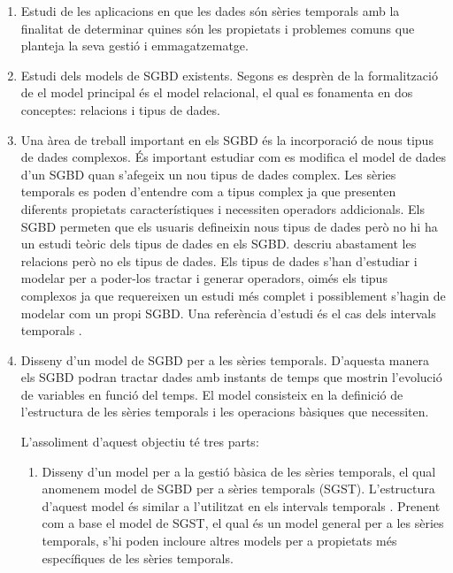 \begin{enumerate}

\item Estudi de les aplicacions en que les dades són sèries temporals
  amb la finalitat de determinar quines són les propietats i problemes
  comuns que planteja la seva gestió i emmagatzematge.

\item Estudi dels models de SGBD existents. Segons es desprèn de la
  formalització de \textcite{date:introduction} el model principal és
  el model relacional, el qual es fonamenta en dos conceptes:
  relacions i tipus de dades. 

\item Una àrea de treball important en els SGBD és la incorporació de
  nous tipus de dades complexos. És important estudiar com es modifica
  el model de dades d'un SGBD quan s'afegeix un nou tipus de dades
  complex.  Les sèries temporals es poden d'entendre com a tipus
  complex ja que presenten diferents propietats característiques i
  necessiten operadors addicionals.  Els SGBD permeten que els usuaris
  defineixin nous tipus de dades \parencite{stonebraker86} però no hi
  ha un estudi teòric dels tipus de dades en els SGBD.
  \textcite{date:introduction} descriu abastament les relacions però
  no els tipus de dades. Els tipus de dades s'han d'estudiar i modelar
  per a poder-los tractar i generar operadors, oimés els tipus
  complexos ja que requereixen un estudi més complet i possiblement
  s'hagin de modelar com un propi SGBD. Una referència d'estudi és el
  cas dels intervals
  temporals \parencite{date02:_tempor_data_relat_model}.

\item Disseny d'un model de SGBD per a les sèries temporals. D'aquesta
  manera els SGBD podran tractar dades amb instants de temps que
  mostrin l'evolució de variables en funció del temps. El model
  consisteix en la definició de l'estructura de les sèries temporals i
  les operacions bàsiques que necessiten.

  L'assoliment d'aquest objectiu té tres parts:

  \begin{enumerate}
  \item Disseny d'un model per a la gestió bàsica de les sèries
    temporals, el qual anomenem model de SGBD per a sèries temporals
    (SGST).  L'estructura d'aquest model és similar a l'utilitzat en
    els intervals
    temporals \parencite{date02:_tempor_data_relat_model}.  Prenent
    com a base el model de SGST, el qual és un model general per a les
    sèries temporals, s'hi poden incloure altres models per a
    propietats més específiques de les sèries temporals.


\end{enumerate}
\end{enumerate}
